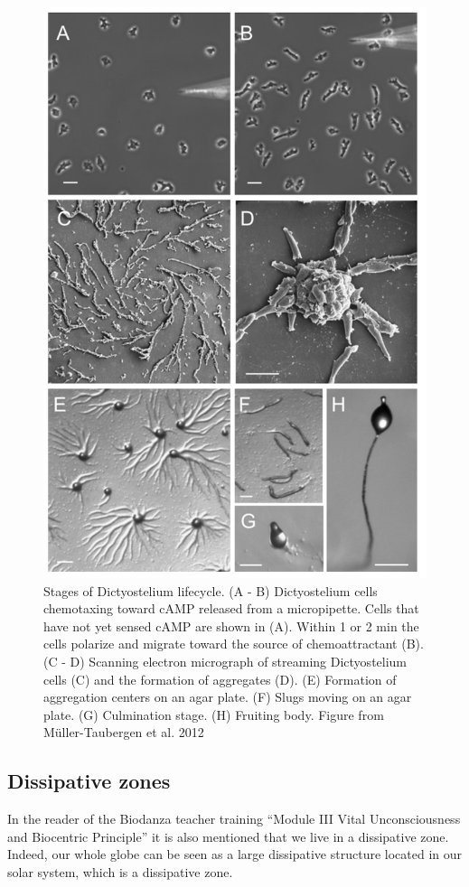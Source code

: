 \documentclass[
  11pt,
]{book}
\begin{document}
\begin{figure}

{\centering \includegraphics[width=0.6\linewidth]{./figs/Dictyostelida} 

}

\caption{Stages of Dictyostelium lifecycle. (A - B) Dictyostelium cells chemotaxing toward cAMP released from a micropipette. Cells that have not yet sensed cAMP are shown in (A). Within 1 or 2 min the cells polarize and migrate toward the source of chemoattractant (B). (C - D) Scanning electron micrograph of streaming Dictyostelium cells (C) and the formation of aggregates (D). (E) Formation of aggregation centers on an agar plate. (F) Slugs moving on an agar plate. (G) Culmination stage. (H) Fruiting body. Figure from Müller-Taubergen et al. 2012}\label{fig:Dictyostelium}
\end{figure}

\hypertarget{dissipative-zones}{%
\subsection{Dissipative zones}\label{dissipative-zones}}

In the reader of the Biodanza teacher training ``Module III Vital Unconsciousness and Biocentric Principle'' it is also mentioned that we live in a dissipative zone. Indeed, our whole globe can be seen as a large dissipative structure located in our solar system, which is a dissipative zone.
\end{document}
